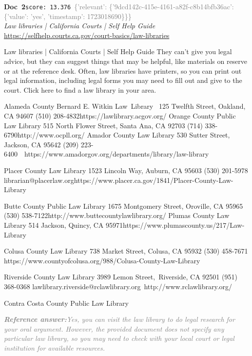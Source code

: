 \documentclass[a4paper,11pt]{article}
\begin{document}
\begin{docenv}
{\footnotesize\textcolor{doccolor}{\textbf{Doc~2}}}\hfill{\tiny\texttt{score:~13.376}}\ {\tiny\textcolor{gray}{\{'relevant': \{'9dcd142c-415e-4161-a82f-c8b14bfb36ac': \{'value': 'yes', 'timestamp': 1723018690\}\}\}}}\\[3pt]
{\small\textit{Law libraries | California Courts | Self Help Guide}}\\[2pt]
{\tiny\url{https://selfhelp.courts.ca.gov/court-basics/law-libraries}}\\[4pt]
{\footnotesize Law libraries | California Courts | Self Help Guide
They can't give you legal advice, but they can suggest things that may be helpful, like materials on reserve or at the reference desk.
Often, law libraries have printers, so you can print out legal information, including legal forms you may need to fill out and give to the court.
Click here to find a law library in your area. 

Alameda County Bernard E. Witkin Law Library 
	125 Twelfth Street, Oakland, CA 94607
	(510) 208-4832https://lawlibrary.acgov.org/
Orange County Public Law Library
	515 North Flower Street, Santa Ana, CA 92703
	(714) 338-6790http://www.ocpll.org/
Amador County Law Library
	530 Sutter Street, Jackson, CA 95642
	(209) 223-6400  https://www.amadorgov.org/departments/library/law-library

​Placer County Law Library
	1523 Lincoln Way, Auburn, CA 95603
	(530) 201-5978
librarian@placerlaw.orghttps://www.placer.ca.gov/1841/Placer-County-Law-Library

Butte County Public Law Library
	1675 Montgomery Street, Oroville, CA 95965
	(530) 538-7122http://www.buttecountylawlibrary.org/
Plumas County Law Library
	514 Jackson, Quincy, CA 95971https://www.plumascounty.us/217/Law-Library

Colusa County Law Library
	738 Market Street, Colusa, CA 95932
	(530) 458-7671
https://www.countyofcolusa.org/988/Colusa-County-Law-Library

Riverside County Law Library
	3989 Lemon Street, Riverside, CA 92501
	(951) 368-0368
lawlibrary.riverside@rclawlibrary.org http://www.rclawlibrary.org/  

Contra Costa County Public Law Library}
\end{docenv}
\begin{refanswerenv}
{\footnotesize\textit{\textcolor{gray}{\textbf{Reference answer:}\enspace Yes, you can visit the law library to do legal research for your oral argument. However, the provided document does not specify any particular law library, so you may need to check with your local court or legal institution for available resources.}}}
\end{refanswerenv}
\end{document}
